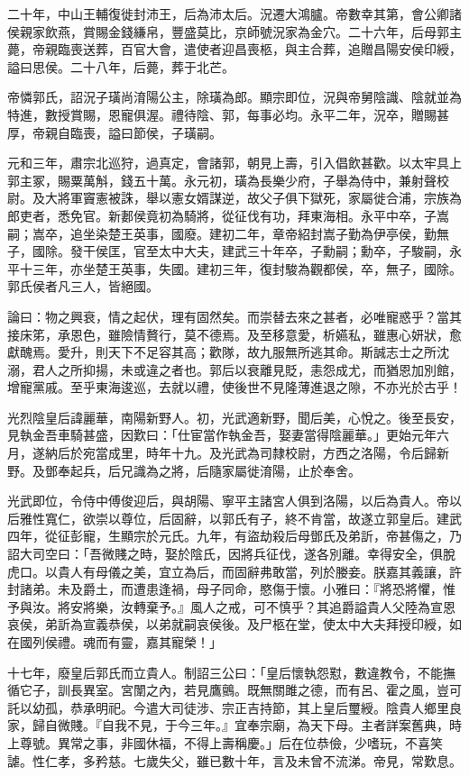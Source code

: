 \begin{pinyinscope}
二十年，中山王輔復徙封沛王，后為沛太后。況遷大鴻臚。帝數幸其第，會公卿諸侯親家飲燕，賞賜金錢縑帛，豐盛莫比，京師號況家為金穴。二十六年，后母郭主薨，帝親臨喪送葬，百官大會，遣使者迎昌喪柩，與主合葬，追贈昌陽安侯印綬，謚曰思侯。二十八年，后薨，葬于北芒。

帝憐郭氏，詔況子璜尚淯陽公主，除璜為郎。顯宗即位，況與帝舅陰識、陰就並為特進，數授賞賜，恩寵俱渥。禮待陰、郭，每事必均。永平二年，況卒，贈賜甚厚，帝親自臨喪，謚曰節侯，子璜嗣。

元和三年，肅宗北巡狩，過真定，會諸郭，朝見上壽，引入倡飲甚歡。以太牢具上郭主冢，賜粟萬斛，錢五十萬。永元初，璜為長樂少府，子舉為侍中，兼射聲校尉。及大將軍竇憲被誅，舉以憲女婿謀逆，故父子俱下獄死，家屬徙合浦，宗族為郎吏者，悉免官。新郪侯竟初為騎將，從征伐有功，拜東海相。永平中卒，子嵩嗣；嵩卒，追坐染楚王英事，國廢。建初二年，章帝紹封嵩子勤為伊亭侯，勤無子，國除。發干侯匡，官至太中大夫，建武三十年卒，子勳嗣；勳卒，子駿嗣，永平十三年，亦坐楚王英事，失國。建初三年，復封駿為觀都侯，卒，無子，國除。郭氏侯者凡三人，皆絕國。

論曰：物之興衰，情之起伏，理有固然矣。而崇替去來之甚者，必唯寵惑乎？當其接床笫，承恩色，雖險情贅行，莫不德焉。及至移意愛，析嬿私，雖惠心妍狀，愈獻醜焉。愛升，則天下不足容其高；歡隊，故九服無所逃其命。斯誠志士之所沈溺，君人之所抑揚，未或違之者也。郭后以衰離見貶，恚怨成尤，而猶恩加別館，增寵黨戚。至乎東海逡巡，去就以禮，使後世不見隆薄進退之隙，不亦光於古乎！

光烈陰皇后諱麗華，南陽新野人。初，光武適新野，聞后美，心悅之。後至長安，見執金吾車騎甚盛，因歎曰：「仕宦當作執金吾，娶妻當得陰麗華。」更始元年六月，遂納后於宛當成里，時年十九。及光武為司隸校尉，方西之洛陽，令后歸新野。及鄧奉起兵，后兄識為之將，后隨家屬徙淯陽，止於奉舍。

光武即位，令侍中傅俊迎后，與胡陽、寧平主諸宮人俱到洛陽，以后為貴人。帝以后雅性寬仁，欲崇以尊位，后固辭，以郭氏有子，終不肯當，故遂立郭皇后。建武四年，從征彭寵，生顯宗於元氏。九年，有盜劫殺后母鄧氏及弟訢，帝甚傷之，乃詔大司空曰：「吾微賤之時，娶於陰氏，因將兵征伐，遂各別離。幸得安全，俱脫虎口。以貴人有母儀之美，宜立為后，而固辭弗敢當，列於媵妾。朕嘉其義讓，許封諸弟。未及爵土，而遭患逢禍，母子同命，愍傷于懷。小雅曰：『將恐將懼，惟予與汝。將安將樂，汝轉棄予。』風人之戒，可不慎乎？其追爵謚貴人父陸為宣恩哀侯，弟訢為宣義恭侯，以弟就嗣哀侯後。及尸柩在堂，使太中大夫拜授印綬，如在國列侯禮。魂而有靈，嘉其寵榮！」

十七年，廢皇后郭氏而立貴人。制詔三公曰：「皇后懷執怨懟，數違教令，不能撫循它子，訓長異室。宮闈之內，若見鷹鸇。既無關雎之德，而有呂、霍之風，豈可託以幼孤，恭承明祀。今遣大司徒涉、宗正吉持節，其上皇后璽綬。陰貴人鄉里良家，歸自微賤。『自我不見，于今三年。』宜奉宗廟，為天下母。主者詳案舊典，時上尊號。異常之事，非國休福，不得上壽稱慶。」后在位恭儉，少嗜玩，不喜笑謔。性仁孝，多矜慈。七歲失父，雖已數十年，言及未曾不流涕。帝見，常歎息。


\end{pinyinscope}
